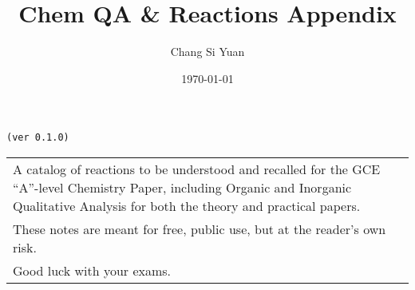 \documentclass[../main]{subfiles}
\begin{document}
\author{Chang Si Yuan}
\title{Chem QA \& Reactions Appendix}
\date{\today}

\maketitle

\begin{center}

	\texttt{(ver 0.1.0)}

	\vspace{50pt}

	\begin{tabular}{>{\flushleft}p{8cm}}
	A catalog of reactions to be understood and recalled for the GCE ``A''-level Chemistry Paper, including Organic and Inorganic Qualitative Analysis for both the theory and practical papers. \\
	These notes are meant for free, public use, but at the reader's own risk. \\
	Good luck with your exams.
	\end{tabular}

\end{center}

\newpage
\end{document}
